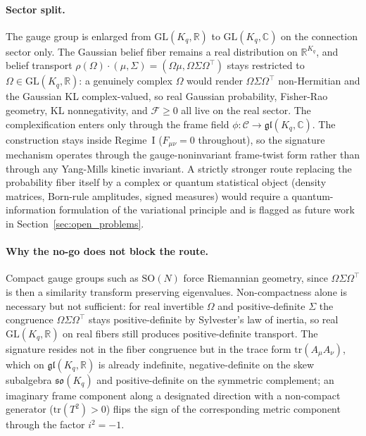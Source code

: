 \documentclass[11pt]{article}
\begin{document}
\paragraph{Sector split.} The gauge group is enlarged from $\mathrm{GL}(K_q,\mathbb{R})$ to $\mathrm{GL}(K_q,\mathbb{C})$ on the connection sector only. The Gaussian belief fiber remains a real distribution on $\mathbb{R}^{K_q}$, and belief transport $\rho(\Omega)\cdot(\mu,\Sigma) = (\Omega\mu, \Omega\Sigma\Omega^\top)$ stays restricted to $\Omega \in \mathrm{GL}(K_q,\mathbb{R})$: a genuinely complex $\Omega$ would render $\Omega\Sigma\Omega^\top$ non-Hermitian and the Gaussian KL complex-valued, so real Gaussian probability, Fisher-Rao geometry, KL nonnegativity, and $\mathcal{F} \ge 0$ all live on the real sector. The complexification enters only through the frame field $\phi: \mathcal{C} \to \mathfrak{gl}(K_q,\mathbb{C})$. The construction stays inside Regime~I ($F_{\mu\nu} = 0$ throughout), so the signature mechanism operates through the gauge-noninvariant frame-twist form rather than through any Yang-Mills kinetic invariant. A strictly stronger route replacing the probability fiber itself by a complex or quantum statistical object (density matrices, Born-rule amplitudes, signed measures) would require a quantum-information formulation of the variational principle and is flagged as future work in Section~\ref{sec:open_problems}.

\paragraph{Why the no-go does not block the route.} Compact gauge groups such as $\mathrm{SO}(N)$ force Riemannian geometry, since $\Omega\Sigma\Omega^\top$ is then a similarity transform preserving eigenvalues. Non-compactness alone is necessary but not sufficient: for real invertible $\Omega$ and positive-definite $\Sigma$ the congruence $\Omega\Sigma\Omega^\top$ stays positive-definite by Sylvester's law of inertia, so real $\mathrm{GL}(K_q,\mathbb{R})$ on real fibers still produces positive-definite transport. The signature resides not in the fiber congruence but in the trace form $\mathrm{tr}(A_\mu A_\nu)$, which on $\mathfrak{gl}(K_q,\mathbb{R})$ is already indefinite, negative-definite on the skew subalgebra $\mathfrak{so}(K_q)$ and positive-definite on the symmetric complement; an imaginary frame component along a designated direction with a non-compact generator ($\mathrm{tr}(T^2) > 0$) flips the sign of the corresponding metric component through the factor $i^2 = -1$.
\end{document}
